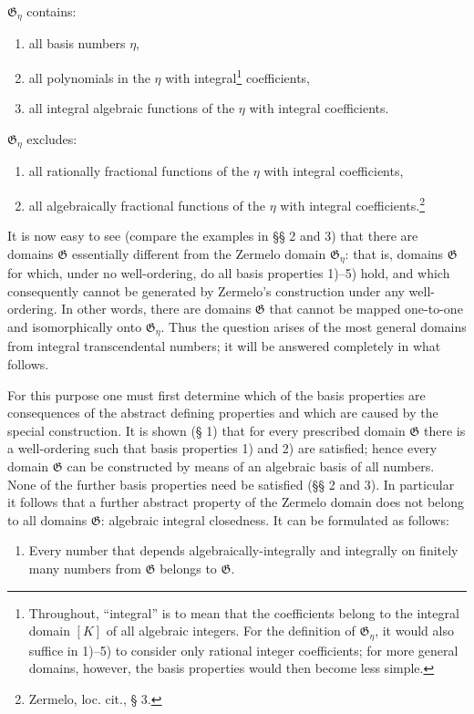 \documentclass[11pt]{article}
\begin{document}
$\mathfrak G_\eta$ contains:
\begin{enumerate}
\item[1)] all basis numbers $\eta$,
\item[2)] all polynomials in the $\eta$ with integral\footnote{Throughout,
``integral'' is to mean that the coefficients belong to the integral domain $[K]$
of all algebraic integers. For the definition of $\mathfrak G_\eta$, it would
also suffice in 1)--5) to consider only rational integer coefficients; for more
general domains, however, the basis properties would then become less simple.}
coefficients,
\item[3)] all integral algebraic functions of the $\eta$ with integral
coefficients.
\end{enumerate}
$\mathfrak G_\eta$ excludes:
\begin{enumerate}
\item[4)] all rationally fractional functions of the $\eta$ with integral
coefficients,
\item[5)] all algebraically fractional functions of the $\eta$ with integral
coefficients.\footnote{Zermelo, loc. cit., § 3.}
\end{enumerate}

It is now easy to see (compare the examples in §§ 2 and 3) that there are
domains $\mathfrak G$ essentially different from the Zermelo domain
$\mathfrak G_\eta$: that is, domains $\mathfrak G$ for which, under no
well-ordering, do all basis properties 1)--5) hold, and which consequently cannot
be generated by Zermelo's construction under any well-ordering. In other words,
there are domains $\mathfrak G$ that cannot be mapped one-to-one and
isomorphically onto $\mathfrak G_\eta$. Thus the question arises of the most
general domains from integral transcendental numbers; it will be answered
completely in what follows.

For this purpose one must first determine which of the basis properties are
consequences of the abstract defining properties and which are caused by the
special construction. It is shown (§ 1) that for every prescribed domain
$\mathfrak G$ there is a well-ordering such that basis properties 1) and 2) are
satisfied; hence every domain $\mathfrak G$ can be constructed by means of an
algebraic basis of all numbers. None of the further basis properties need be
satisfied (§§ 2 and 3). In particular it follows that a further abstract property
of the Zermelo domain does not belong to all domains $\mathfrak G$: algebraic
integral closedness. It can be formulated as follows:
\begin{enumerate}
\item[V.] Every number that depends algebraically-integrally and integrally on
finitely many numbers from $\mathfrak G$ belongs to $\mathfrak G$.
\end{enumerate}
\end{document}
